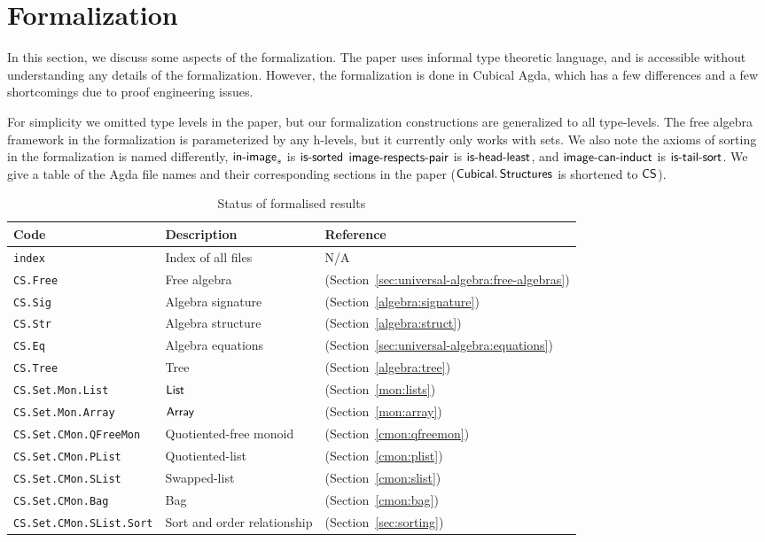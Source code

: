\section{Formalization}
\label{sec:formalization}

In this section, we discuss some aspects of the formalization.
The paper uses informal type theoretic language,
and is accessible without understanding any details of the formalization.
However, the formalization is done in Cubical Agda, which has a few differences and a few
shortcomings due to proof engineering issues.

For simplicity we omitted type levels in the paper, but our formalization constructions
are generalized to all type-levels.
The free algebra framework in the formalization is
parameterized by any h-levels, but it currently only works with sets.
We also note the axioms of sorting in the formalization is named differently,
$\operatorname{\mathsf{in-image}}_s$ is $\operatorname{\mathsf{is-sorted}}$
$\operatorname{\mathsf{image-respects-pair}}$ is $\operatorname{\mathsf{is-head-least}}$, and
$\operatorname{\mathsf{image-can-induct}}$ is $\operatorname{\mathsf{is-tail-sort}}$.
We give a table of the Agda file names and their corresponding sections
in the paper ($\operatorname{\mathsf{Cubical.Structures}}$ is shortened to $\operatorname{\mathsf{CS}}$).

\begin{table}[h]\label{appendix:formalizations}
\centering
\begin{tabular}{lll}
\hline
\textbf{Code} & \textbf{Description} & \textbf{Reference}               \\ \hline
\texttt{index} & Index of all files & N/A \\
\texttt{CS.Free}         & Free algebra            & (Section~\cref{sec:universal-algebra:free-algebras}) \\
\texttt{CS.Sig}         & Algebra signature            & (Section~\cref{algebra:signature}) \\
\texttt{CS.Str}         & Algebra structure            & (Section~\cref{algebra:struct}) \\
\texttt{CS.Eq}         & Algebra equations            & (Section~\cref{sec:universal-algebra:equations}) \\
\texttt{CS.Tree}         & Tree     & (Section~\cref{algebra:tree}) \\
\texttt{CS.Set.Mon.List} & $\operatorname{\mathsf{List}}$  & (Section~\cref{mon:lists}) \\
\texttt{CS.Set.Mon.Array} & $\operatorname{\mathsf{Array}}$  & (Section~\cref{mon:array})\\
\texttt{CS.Set.CMon.QFreeMon} & Quotiented-free monoid & (Section~\cref{cmon:qfreemon}) \\
\texttt{CS.Set.CMon.PList} & Quotiented-list & (Section~\cref{cmon:plist}) \\
\texttt{CS.Set.CMon.SList} & Swapped-list & (Section~\cref{cmon:slist}) \\
\texttt{CS.Set.CMon.Bag} & Bag & (Section~\cref{cmon:bag}) \\
\texttt{CS.Set.CMon.SList.Sort} & Sort and order relationship & (Section~\cref{sec:sorting}) \\
\hline
\end{tabular}
\caption{Status of formalised results}
\label{tab:formalised_results}
\end{table}
